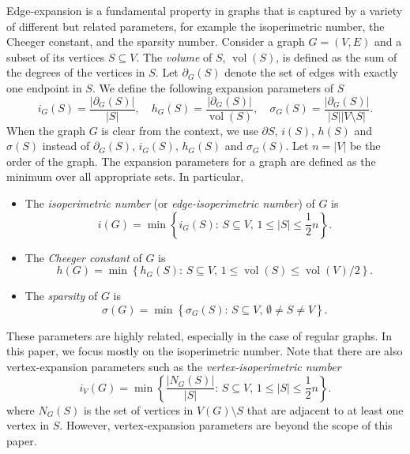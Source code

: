 \documentclass[a4paper,11pt]{article}
\theoremstyle{definition}
\DeclareMathOperator{\vol}{vol}
\begin{document}
Edge-expansion is a fundamental property in graphs that is captured by a variety of different but related parameters, for example the isoperimetric number, the Cheeger constant, and the sparsity number. 
Consider a graph $G=(V, E)$ and a subset of its vertices $S \subseteq V$. The \emph{volume} of $S$, $\vol(S)$, is defined as the sum of the degrees of the vertices in $S$. Let $\partial_G(S)$ denote the set of edges with exactly one endpoint in $S$. We define the following expansion parameters of $S$
\begin{equation*}
    i_G(S) = \frac{|\partial_G(S)|}{|S|},\quad h_G(S) = \frac{|\partial_G(S)|}{\vol(S)}, \quad \sigma_G(S) = \frac{|\partial_G(S)|}{|S||V\setminus S|}. 
\end{equation*}
When the graph \(G\) is clear from the context, we use \(\partial S\), \(i(S)\), \(h(S)\) and \(\sigma(S)\) instead of \(\partial_G(S)\), \(i_G(S)\), \(h_G(S)\) and \(\sigma_G(S)\). Let $n = |V|$ be the order of the graph. The expansion parameters for a graph are defined as the minimum over all appropriate sets. In particular,
\begin{itemize}
    \item The \emph{isoperimetric number} (or \emph{edge-isoperimetric number}) of $G$ is
\begin{equation*}
    i(G) = \min\left\{i_G(S)\colon\,S \subseteq V,\,1 \leq |S| \leq\frac12 n\right\}.
\end{equation*}
\item The \emph{Cheeger constant} of $G$ is   
\begin{equation*}
    h(G) = \min\left\{h_G(S)\colon\,S \subseteq V,\,1 \leq \vol(S) \leq \vol(V)/2\right\}.
\end{equation*}

\item The \emph{sparsity} of $G$ is   
\begin{equation*}
    \sigma(G) = \min\left\{\sigma_G(S)\colon\,S \subseteq V,\,\emptyset\neq S\neq V\right\}.
\end{equation*}
\end{itemize}

\noindent These parameters are highly related, especially in the case of regular graphs. In this paper, we focus mostly on the isoperimetric number. Note that there are also vertex-expansion parameters such as the \emph{vertex-isoperimetric number}
\begin{equation*}
    i_V(G) = \min\left\{\frac{|N_G(S)|}{|S|}\colon\,S \subseteq V,\,1 \leq |S| \leq\frac12 n\right\}.
\end{equation*}
where \(N_G(S)\) is the set of vertices in \(V(G)\setminus S\) that are adjacent to at least one vertex in \(S\).
However, vertex-expansion parameters are beyond the scope of this paper.
\end{document}
